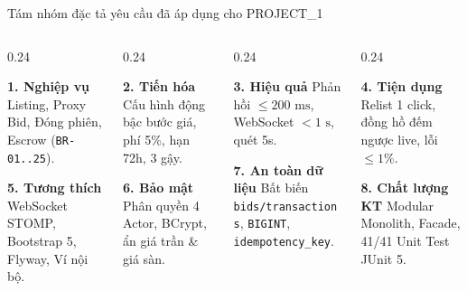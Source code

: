 \documentclass[aspectratio=169, 10pt]{beamer}
\begin{document}
\begin{frame}{Tám nhóm đặc tả yêu cầu đã áp dụng cho PROJECT\_1}
    \begin{columns}[t]
        \begin{column}{0.24\textwidth}
            \begin{block}{\centering \textbf{1. Nghiệp vụ}}
                \footnotesize Listing, Proxy Bid, Đóng phiên, Escrow (\texttt{BR-01..25}).
            \end{block}
            \vspace{0.2cm}
            \begin{block}{\centering \textbf{5. Tương thích}}
                \footnotesize WebSocket STOMP, Bootstrap 5, Flyway, Ví nội bộ.
            \end{block}
        \end{column}
        \begin{column}{0.24\textwidth}
            \begin{block}{\centering \textbf{2. Tiến hóa}}
                \footnotesize Cấu hình động bậc bước giá, phí 5\%, hạn 72h, 3 gậy.
            \end{block}
            \vspace{0.2cm}
            \begin{block}{\centering \textbf{6. Bảo mật}}
                \footnotesize Phân quyền 4 Actor, BCrypt, ẩn giá trần \& giá sàn.
            \end{block}
        \end{column}
        \begin{column}{0.24\textwidth}
            \begin{block}{\centering \textbf{3. Hiệu quả}}
                \footnotesize Phản hồi $\le 200\text{ ms}$, WebSocket $< 1\text{ s}$, quét 5s.
            \end{block}
            \vspace{0.2cm}
            \begin{block}{\centering \textbf{7. An toàn dữ liệu}}
                \footnotesize Bất biến \texttt{bids/transactions}, \texttt{BIGINT}, \texttt{idempotency\_key}.
            \end{block}
        \end{column}
        \begin{column}{0.24\textwidth}
            \begin{block}{\centering \textbf{4. Tiện dụng}}
                \footnotesize Relist 1 click, đồng hồ đếm ngược live, lỗi $\le 1\%$.
            \end{block}
            \vspace{0.2cm}
            \begin{block}{\centering \textbf{8. Chất lượng KT}}
                \footnotesize Modular Monolith, Facade, 41/41 Unit Test JUnit 5.
            \end{block}
        \end{column}
    \end{columns}
\end{frame}
\end{document}
